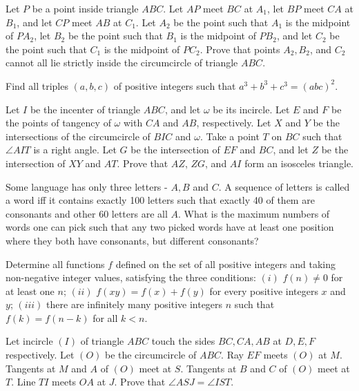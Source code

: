 \documentclass[11pt]{scrartcl}
\begin{document}
\begin{problem}[3245291910836201005]
	Let $P$ be a point inside triangle $ABC$. Let $AP$ meet $BC$ at $A_1$, let $BP$ meet $CA$ at $B_1$, and let $CP$ meet $AB$ at $C_1$. Let $A_2$ be the point such that $A_1$ is the midpoint of $PA_2$, let $B_2$ be the point such that $B_1$ is the midpoint of $PB_2$, and let $C_2$ be the point such that $C_1$ is the midpoint of $PC_2$. Prove that points $A_2, B_2$, and $C_2$ cannot all lie strictly inside the circumcircle of triangle $ABC$.
\end{problem}
\begin{problem}[7088779505939683183]
Find all triples $(a, b, c)$ of positive integers such that $a^3 + b^3 + c^3 = (abc)^2$.
\end{problem}
\begin{problem}[651490142085731]
	Let $I$ be the incenter of triangle $ABC$, and let $\omega$ be its incircle. Let $E$ and $F$ be the points of tangency of $\omega$ with $CA$ and $AB$, respectively. Let $X$ and $Y$ be the intersections of the circumcircle of $BIC$ and $\omega$. Take a point $T$ on $BC$ such that $\angle AIT$ is a right angle. Let $G$ be the intersection of $EF$ and $BC$, and let $Z$ be the intersection of $XY$ and $AT$. Prove that $AZ$, $ZG$, and $AI$ form an isosceles triangle.
\end{problem}
\begin{problem}[1736102587052874498]
Some language has only three letters - $A, B$ and $C$. A sequence of letters is called a word iff it contains exactly 100 letters such that exactly 40 of them are consonants and other 60 letters are all $A$. What is the maximum numbers of words one can pick such that any two picked words have at least one position where they both have consonants, but different consonants?
\end{problem}
\begin{problem}[6116877365036470315]
	Determine all functions $f$ defined on the set of all positive integers and taking non-negative integer values, satisfying the three conditions:
$(i)$ $f(n) \neq 0$ for at least one $n$;
$(ii)$ $f(x y)=f(x)+f(y)$ for every positive integers $x$ and $y$;
$(iii)$ there are infinitely many positive integers $n$ such that $f(k)=f(n-k)$ for all $k<n$.
\end{problem}
\begin{problem}[8972547734710795566]
Let incircle $(I)$ of triangle $ABC$ touch the sides $BC,CA,AB$ at $D,E,F$ respectively. Let $(O)$ be the circumcircle of $ABC$. Ray $EF$ meets $(O)$ at $M$. Tangents at $M$ and $A$ of $(O)$ meet at $S$. Tangents at $B$ and $C$ of $(O)$ meet at $T$. Line $TI$ meets $OA$ at $J$. Prove that $\angle ASJ=\angle IST$.
\end{problem}
\end{document}
